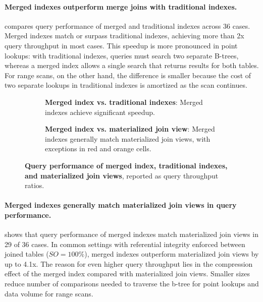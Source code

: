 \documentclass[biblatex, english]{lni}
\begin{document}
\paragraph{Merged indexes outperform merge joins with traditional indexes.}

 compares query performance of merged and traditional indexes across 36 cases.
Merged indexes match or surpass traditional indexes, achieving more than 2x query throughput in most cases.
This speedup is more pronounced in point lookups: with traditional indexes, queries must search two separate B-trees, whereas a merged index allows a single search that returns results for both tables. For range scans, on the other hand, the difference is smaller because the cost of two separate lookups in traditional indexes is amortized as the scan continues.

\begin{figure}[htb]
    \centering
    \begin{subfigure}{\linewidth}
        \centering
        \caption{\textbf{Merged index vs. traditional indexes}:
            Merged indexes achieve significant speedup.}\label{fig:query_speedup}
    \end{subfigure}

    \begin{subfigure}{\linewidth}
        \centering
        \caption{\textbf{Merged index vs. materialized join view}:
            Merged indexes generally match materialized join views, with exceptions in red and orange cells.
    }\label{fig:query_match}
    \end{subfigure}
    \caption{\textbf{Query performance of merged index, traditional indexes, and materialized join views}, reported as query throughput ratios.}\label{fig:query_all}
\end{figure}

\paragraph{Merged indexes generally match materialized join views in query performance.}

 shows that query performance of merged indexes match materialized join views in 29 of 36 cases.
In common settings with referential integrity enforced between joined tables (\(SO=100\%\)), merged indexes outperform materialized join views by up to 4.1x.
The reason for even higher query throughput lies in the compression effect of the merged index compared with materialized join views.
Smaller sizes reduce number of comparisons needed to traverse the b-tree for point lookups and data volume for range scans.
\end{document}
